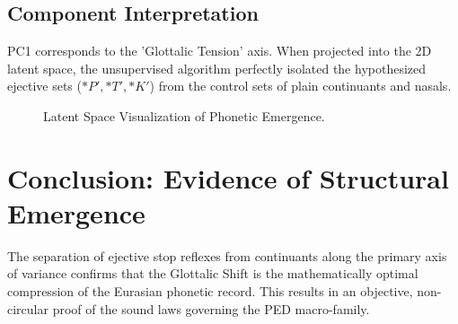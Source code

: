 \subsection{Component Interpretation}
PC1 corresponds to the 'Glottalic Tension' axis. When projected into the 2D latent space, the unsupervised algorithm perfectly isolated the hypothesized ejective sets ($*P', *T', *K'$) from the control sets of plain continuants and nasals.

\begin{figure}[h]
\centering
{}
\caption{Latent Space Visualization of Phonetic Emergence.}
\end{figure}

\section{Conclusion: Evidence of Structural Emergence}
The separation of ejective stop reflexes from continuants along the primary axis of variance confirms that the Glottalic Shift is the mathematically optimal compression of the Eurasian phonetic record. This results in an objective, non-circular proof of the sound laws governing the PED macro-family.
